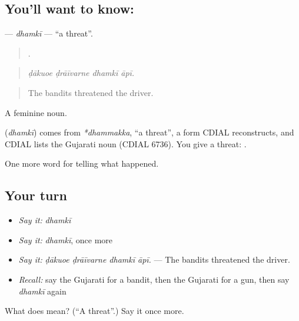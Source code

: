 \subsection*{You'll want to know: }
\textbf{} — \emph{dhamkī} — \textquotedblleft{}a threat\textquotedblright{}.

\begin{quote}
   .
\end{quote}

\begin{quote}
\emph{ḍākuoe ḍrāīvarne dhamkī āpī.}
\end{quote}

\begin{quote}
The bandits threatened the driver.
\end{quote}

A feminine noun.

\begin{cousinweb}
\textbf{} (\emph{dhamkī}) comes from \emph{*dhammakka}, \textquotedblleft{}a threat\textquotedblright{}, a form CDIAL reconstructs, and CDIAL lists the Gujarati noun (CDIAL 6736). You give a threat: \textbf{ }.
\end{cousinweb}

\begin{grammarlens}[title={What you've built}]
One more word for telling what happened.
\end{grammarlens}

\subsection*{Your turn}
\begin{itemize}
\raggedright
  \item \emph{Say it:} \emph{dhamkī}
  \item \emph{Say it:} \emph{dhamkī}, once more
  \item \emph{Say it:} \emph{ḍākuoe ḍrāīvarne dhamkī āpī.} — The bandits threatened the driver.
  \item \emph{Recall:} say the Gujarati for a bandit, then the Gujarati for a gun, then say \emph{dhamkī} again
\end{itemize}

\begin{tcolorbox}[breakable,colback=teal!4,colframe=teal!35!black,title={Before you move on}]
What does  mean? (\textquotedblleft{}A threat\textquotedblright{}.) Say it once more.
\end{tcolorbox}
